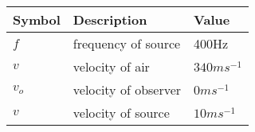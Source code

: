 \begin{tabular}{ | m{1.0cm} | m{3cm} |m{1.0cm}| } 
  \hline
 Symbol & Description  & Value\\ 
 \hline
 $f$ & frequency of source & 400Hz\\
\hline
$v$& velocity of air   &  $340 ms^{-1} $\\
\hline
$v_o$& velocity of observer   &  $0 ms^{-1} $\\
\hline
$v$& velocity of source   &  $10 ms^{-1} $\\
\hline

\end{tabular}\\
\caption{}
\label{Table:2}